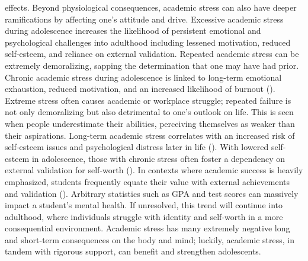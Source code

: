 \documentclass[12pt, a4paper, twoside]{article}
\begin{document}
effects. Beyond physiological consequences, academic stress can also have deeper ramifications by affecting one’s attitude and drive. Excessive academic stress during adolescence increases the likelihood of persistent emotional and psychological challenges into adulthood including lessened motivation, reduced self-esteem, and reliance on external validation. Repeated academic stress can be extremely demoralizing, sapping the determination that one may have had prior. Chronic academic stress during adolescence is linked to long-term emotional exhaustion, reduced motivation, and an increased likelihood of burnout (\cite{cordovaolivera2023}). Extreme stress often causes academic or workplace struggle; repeated failure is not only demoralizing but also detrimental to one’s outlook on life. This is seen when people underestimate their abilities, perceiving themselves as weaker than their aspirations. Long-term academic stress correlates with an increased risk of self-esteem issues and psychological distress later in life (\cite{almroth2019}). With lowered self-esteem in adolescence, those with chronic stress often foster a dependency on external validation for self-worth (\cite{cordovaolivera2023}). In contexts where academic success is heavily emphasized, students frequently equate their value with external achievements and validation (\cite{almroth2019}). Arbitrary statistics such as GPA and test scores can massively impact a student’s mental health. If unresolved, this trend will continue into adulthood, where individuals struggle with identity and self-worth in a more consequential environment. Academic stress has many extremely negative long and short-term consequences on the body and mind; luckily, academic stress, in tandem with rigorous support, can benefit and strengthen adolescents. 
\end{document}
